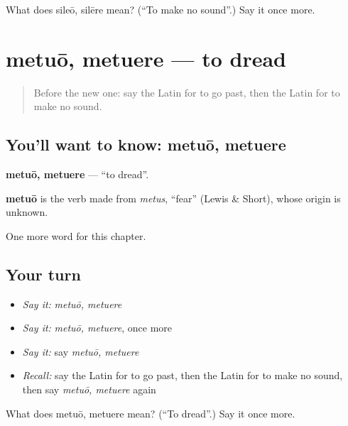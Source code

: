 \begin{tcolorbox}[breakable,colback=teal!4,colframe=teal!35!black,title={Before you move on}]
What does sileō, silēre mean? (\textquotedblleft{}To make no sound\textquotedblright{}.) Say it once more.
\end{tcolorbox}
\section[metuō, metuere]{metuō, metuere — to dread}

\label{lesson:LA-C258-metuo}



\begin{quote}
Before the new one: say the Latin for to go past, then the Latin for to make no sound.
\end{quote}

\subsection*{You'll want to know: metuō, metuere}
\textbf{metuō, metuere} — \textquotedblleft{}to dread\textquotedblright{}.

\begin{cousinweb}
\textbf{metuō} is the verb made from \emph{metus}, \textquotedblleft{}fear\textquotedblright{} (Lewis \& Short), whose origin is unknown.
\end{cousinweb}

\begin{grammarlens}[title={What you've built}]
One more word for this chapter.
\end{grammarlens}

\subsection*{Your turn}
\begin{itemize}
\raggedright
  \item \emph{Say it:} \emph{metuō, metuere}
  \item \emph{Say it:} \emph{metuō, metuere}, once more
  \item \emph{Say it:} say \emph{metuō, metuere}
  \item \emph{Recall:} say the Latin for to go past, then the Latin for to make no sound, then say \emph{metuō, metuere} again
\end{itemize}

\begin{tcolorbox}[breakable,colback=teal!4,colframe=teal!35!black,title={Before you move on}]
What does metuō, metuere mean? (\textquotedblleft{}To dread\textquotedblright{}.) Say it once more.
\end{tcolorbox}
